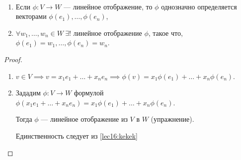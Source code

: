 \begin{proposal}~
    \begin{enumerate}
    \item Если $\phi : V \to W$ --- линейное отображение, то $\phi$ однозначно определяется векторами $\phi(e_1), \dots, \phi(e_n)$,
    \item $\forall w_1, \dots, w_n \in W \ \exists!$ линейное отображение $\phi$, такое что, $\phi(e_1) = w_1, \dots, \phi(e_n) = w_n$.
    \end{enumerate}
\end{proposal}

\begin{proof}~
    \begin{enumerate}
    \item \label{lec16:kekek}
        $v \in V \implies v = x_1 e_1 + \dots + x_n e_n \implies \phi(v) = x_1 \phi(e_1) + \dots + x_n \phi(e_n)$.
    \item 
        Зададим $\phi : V \to W$ формулой $\phi(x_1 e_1 + \dots + x_n e_n) = x_1 \phi(e_1) + \dots + x_n \phi(e_n)$.

        Тогда $\phi$ --- линейное отображение из $V$ в $W$ (упражнение).

        Единственность следует из \ref{lec16:kekek}
        \qedhere
    \end{enumerate}
\end{proof}
